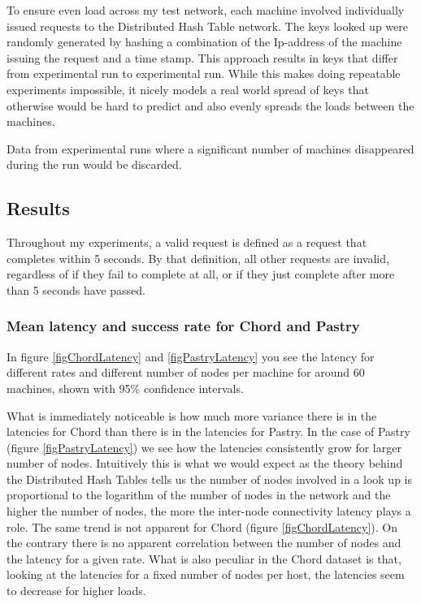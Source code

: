 \mbox{}
To ensure even load across my test network, each machine involved individually issued requests to the Distributed Hash Table network.
The keys looked up were randomly generated by hashing a combination of the Ip-address of the machine issuing the request and a time stamp. This approach results in keys that differ from experimental run to experimental run. While this makes doing repeatable experiments impossible, it nicely models a real world spread of keys that otherwise would be hard to predict and also evenly spreads the loads between the machines.

Data from experimental runs where a significant number of machines disappeared during the run would be discarded.


\subsection{Results}
Throughout my experiments, a valid request is defined as a request that completes within 5 seconds. By that definition, all other requests are invalid, regardless of if they fail to complete at all, or if they just complete after more than 5 seconds have passed.

\subsubsection{Mean latency and success rate for Chord and Pastry}
In figure \ref{figChordLatency} and \ref{figPastryLatency} you see the latency for different rates and different number of nodes per machine for around 60 machines, shown with 95\% confidence intervals. 

What is immediately noticeable is how much more variance there is in the latencies for Chord than there is in the latencies for Pastry.
In the case of Pastry (figure \ref{figPastryLatency}) we see how the latencies consistently grow for larger number of nodes. Intuitively this is what we would expect as the theory behind the Distributed Hash Tables tells us the number of nodes involved in a look up is proportional to the logarithm of the number of nodes in the network and the higher the number of nodes, the more the inter-node connectivity latency plays a role. The same trend is not apparent for Chord (figure \ref{figChordLatency}). On the contrary there is no apparent correlation between the number of nodes and the latency for a given rate. What is also peculiar in the Chord dataset is that, looking at the latencies for a fixed number of nodes per host, the latencies seem to decrease for higher loads.

